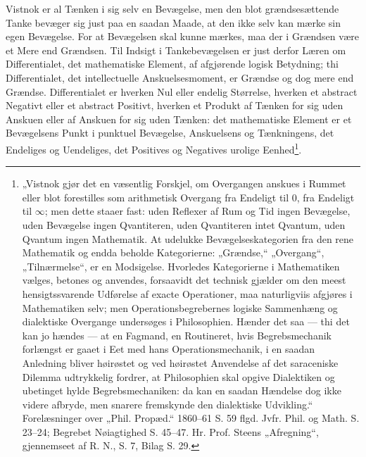 \documentclass[11pt]{book}
\newcommand{\opage}[1]{\marginnote{\footnotesize\textit{[#1]}}}
\begin{document}
Vistnok er al Tænken i sig selv en Bevægelse, men den blot
grændsesættende Tanke bevæger sig just paa en saadan Maade, at den
ikke selv kan mærke sin egen Bevægelse. For at Bevægelsen skal kunne
mærkes, maa der i Grændsen være et Mere end Grændsen. Til Indsigt i
Tankebevægelsen er just derfor Læren om Differentialet, det
mathematiske Element, af afgjørende logisk Betydning; thi
Differentialet, det intellectuelle Anskuelsesmoment, er Grændse og
dog mere end Grændse. Differentialet er hverken Nul eller endelig
Størrelse, hverken et abstract Negativt eller et abstract Positivt,
hverken et Produkt af Tænken for sig uden Anskuen eller af Anskuen
for sig uden Tænken: det mathematiske Element er
\opage{23} \setcounter{footnote}{0}%
et Bevægelsens Punkt i punktuel Bevægelse, Anskuelsens og
Tænkningens, det Endeliges og Uendeliges, det Positives og Negatives
urolige Eenhed\footnote{„Vistnok gjør det en væsentlig Forskjel, om
Overgangen anskues i Rummet eller blot forestilles som arithmetisk
Overgang fra Endeligt til 0, fra Endeligt til $\infty$; men dette
staaer fast: uden Reflexer af Rum og Tid ingen Bevægelse, uden
Bevægelse ingen Qvantiteren, uden Qvantiteren intet Qvantum, uden
Qvantum ingen Mathematik. At udelukke Bevægelseskategorien fra den
rene Mathematik og endda beholde Kategorierne: „Grændse,“
„Overgang“, „Tilnærmelse“, er en Modsigelse. Hvorledes Kategorierne i
Mathematiken vælges, betones og anvendes, forsaavidt det technisk
gjælder om den meest hensigtssvarende Udførelse af exacte
Operationer, maa naturligviis afgjøres i Mathematiken selv; men
Operationsbegrebernes logiske Sammenhæng og dialektiske Overgange
undersøges i Philosophien. Hænder det saa --- thi det kan jo hændes
--- at en Fagmand, en Routineret, hvis Begrebsmechanik forlængst er
gaaet i Eet med hans Operationsmechanik, i en saadan Anledning bliver
høirøstet og ved høirøstet Anvendelse af det saraceniske Dilemma
udtrykkelig fordrer, at Philosophien skal opgive Dialektiken og
ubetinget hylde Begrebsmechaniken: da kan en saadan Hændelse dog ikke
videre afbryde, men snarere fremskynde den dialektiske Udvikling.“
Forelæsninger over „Phil. Propæd.“ 1860--61 S. 59 flgd. Jvfr. Phil.
og Math. S. 23--24; Begrebet Nøiagtighed S. 45--47. Hr. Prof. Steens
„Afregning“, gjennemseet af R. N., S. 7, Bilag S. 29.}.
\end{document}
